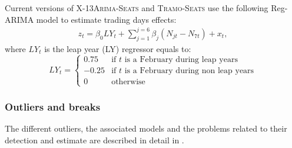 \documentclass[12pt, a4paper]{article}
\begin{document}
Current versions of \textsc{X-13Arima-Seats} and \textsc{Tramo-Seats} use the following Reg-ARIMA model to estimate trading days effects:
\begin{eqnarray}
	\label{eq:eq3}
z_t=\beta_0 LY_t + \sum_{j=1}^{j=6} \beta_j \left(N_{jt} - N_{7t}\right) + x_t,
\end{eqnarray}
where $LY_t$ is the leap year (LY) regressor equals to:
\[
LY_{t} = \left\{ \begin{array}{rl} 
                0.75 & \mbox{if } t \mbox{ is a February during leap years} \\
                -0.25 & \mbox{if } t \mbox{ is a February during non leap years} \\
                0 & \mbox{otherwise}
               \end{array}
         \right.
\]


\subsubsection{Outliers and breaks}
\label{sec:PAR}

The different outliers, the associated models and the problems related to their detection and estimate are described in detail in \cite{Me2018}.
\end{document}
